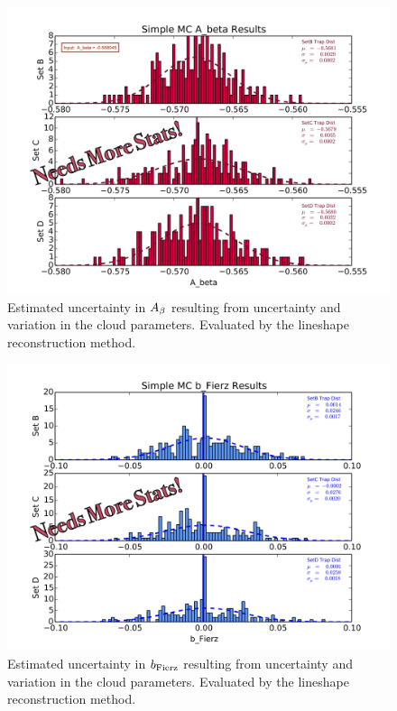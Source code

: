 	    \begin{figure}[h!!]
    	\centering
    	\includegraphics[width=.999\linewidth]
    	{Figures/Position_Err_Abeta_prelim.png}
    	\caption[$\Abeta$ Position Error]{Estimated uncertainty in $\Abeta$ resulting from uncertainty and variation in the cloud parameters.  Evaluated by the lineshape reconstruction method.}	
    	\label{fig:Abeta_position_err}
		\end{figure}

	    \begin{figure}[h!!]
    	\centering
    	\includegraphics[width=.999\linewidth]
    	{Figures/Position_Err_bFierz_prelim.png}
    	\caption[$\bFierz$ Position Error]{Estimated uncertainty in $\bFierz$ resulting from uncertainty and variation in the cloud parameters.  Evaluated by the lineshape reconstruction method.}		
    	\label{fig:bFierz_position_err}
		\end{figure}

